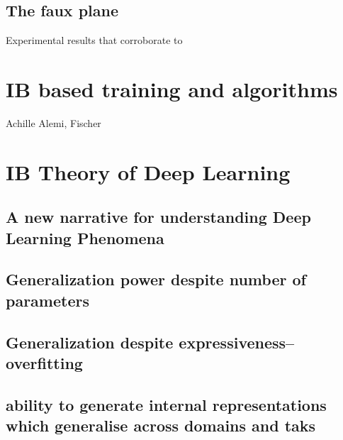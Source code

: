 \subsection{The faux plane}
	Experimental results that corroborate to
\section{IB based training and algorithms}
Achille
Alemi, Fischer
\section{IB Theory of Deep Learning}
\subsection{A new narrative for understanding Deep Learning Phenomena}


\subsection{Generalization power despite number of parameters}
\subsection{Generalization despite expressiveness--overfitting}
\subsection{ability to generate internal representations which generalise across domains and taks}

